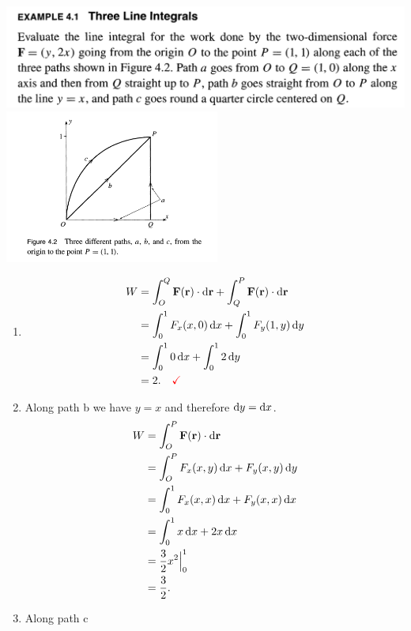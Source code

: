 

\begin{mdframed}
  \includegraphics[width=400pt]{img/physics--classical-mechanics--taylor--ex-4-1.png}\\
  \includegraphics[width=200pt]{img/physics--classical-mechanics--taylor--ex-4-1-diag.png}
\end{mdframed}
\begin{enumerate}[label=(\alph*)]
\item
\begin{align*}
  W
  &= \int_O^Q \F(\r) \cdot \d\r + \int_Q^P \F(\r) \cdot \d\r \\
  &= \int_0^1 F_x(x, 0) \dx + \int_0^1 F_y(1, y) \dy \\
  &= \int_0^1 0 \dx + \int_0^1 2 \dy \\
  &= 2. ~~~ \red{\checkmark}
\end{align*}
\item Along path b we have $y = x$ and therefore $\dy = \dx$.
\begin{align*}
  W
  &= \int_O^P \F(\r) \cdot \d\r \\
  &= \int_O^P F_x(x, y) \dx + F_y(x, y) \dy \\
  &= \int_0^1 F_x(x, x) \dx + F_y(x, x) \dx \\
  &= \int_0^1 x \dx + 2x \dx \\
  &= \frac{3}{2}x^2\Big|_0^1 \\
  &= \frac{3}{2}.
\end{align*}
\item Along path c


\end{enumerate}

